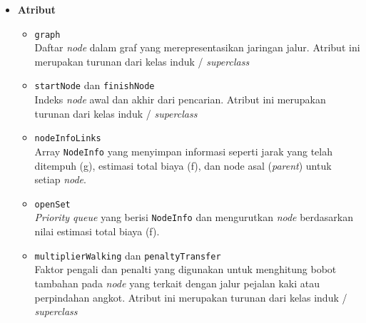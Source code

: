 \begin{itemize}
    \item \textbf{Atribut}
    \begin{itemize}
        \item \texttt{graph}
        \\ Daftar \textit{node} dalam graf yang merepresentasikan jaringan jalur. Atribut ini merupakan turunan dari kelas induk / \textit{superclass}
        \item \texttt{startNode} dan \texttt{finishNode}
        \\ Indeks \textit{node} awal dan akhir dari pencarian. Atribut ini merupakan turunan dari kelas induk / \textit{superclass}
        \item \texttt{nodeInfoLinks}
        \\ Array \texttt{NodeInfo} yang menyimpan informasi seperti jarak yang telah ditempuh (g), estimasi total biaya (f), dan node asal (\textit{parent}) untuk setiap \textit{node}.
        \item \texttt{openSet}
        \\ \textit{Priority queue} yang berisi \texttt{NodeInfo} dan mengurutkan \textit{node} berdasarkan nilai estimasi total biaya (f).
        \item \texttt{multiplierWalking} dan \texttt{penaltyTransfer}
        \\ Faktor pengali dan penalti yang digunakan untuk menghitung bobot tambahan pada \textit{node} yang terkait dengan jalur pejalan kaki atau perpindahan angkot. Atribut ini merupakan turunan dari kelas induk / \textit{superclass}
    \end{itemize}


\end{itemize}
